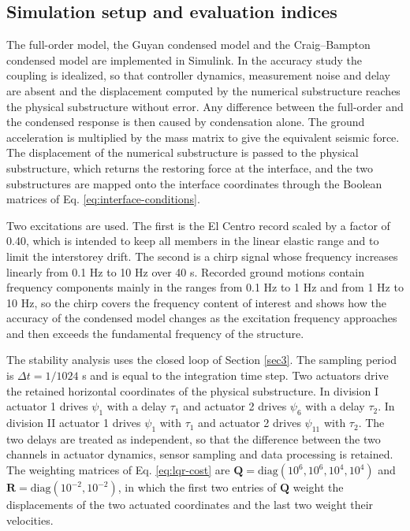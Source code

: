 \documentclass[11pt,a4paper]{article}
\numberwithin{equation}{section}
\begin{document}
\subsection{Simulation setup and evaluation indices}
\label{sec:setup}

The full-order model, the Guyan condensed model and the Craig--Bampton condensed model are implemented in Simulink. In the accuracy study the coupling is idealized, so that controller dynamics, measurement noise and delay are absent and the displacement computed by the numerical substructure reaches the physical substructure without error. Any difference between the full-order and the condensed response is then caused by condensation alone. The ground acceleration is multiplied by the mass matrix to give the equivalent seismic force. The displacement of the numerical substructure is passed to the physical substructure, which returns the restoring force at the interface, and the two substructures are mapped onto the interface coordinates through the Boolean matrices of Eq. \eqref{eq:interface-conditions}.

Two excitations are used. The first is the El Centro record scaled by a factor of 0.40, which is intended to keep all members in the linear elastic range and to limit the interstorey drift. The second is a chirp signal whose frequency increases linearly from 0.1 Hz to 10 Hz over 40 s. Recorded ground motions contain frequency components mainly in the ranges from 0.1 Hz to 1 Hz and from 1 Hz to 10 Hz, so the chirp covers the frequency content of interest and shows how the accuracy of the condensed model changes as the excitation frequency approaches and then exceeds the fundamental frequency of the structure.

The stability analysis uses the closed loop of Section \ref{sec3}. The sampling period is \(\Delta t=1/1024\) s and is equal to the integration time step. Two actuators drive the retained horizontal coordinates of the physical substructure. In division I actuator 1 drives \(\psi_{1}\) with a delay \(\tau_{1}\) and actuator 2 drives \(\psi_{6}\) with a delay \(\tau_{2}\). In division II actuator 1 drives \(\psi_{1}\) with \(\tau_{1}\) and actuator 2 drives \(\psi_{11}\) with \(\tau_{2}\). The two delays are treated as independent, so that the difference between the two channels in actuator dynamics, sensor sampling and data processing is retained. The weighting matrices of Eq. \eqref{eq:lqr-cost} are \(\mathbf{Q}=\mathrm{diag}(10^{6},10^{6},10^{4},10^{4})\) and \(\mathbf{R}=\mathrm{diag}(10^{-2},10^{-2})\), in which the first two entries of \(\mathbf{Q}\) weight the displacements of the two actuated coordinates and the last two weight their velocities.
\end{document}
